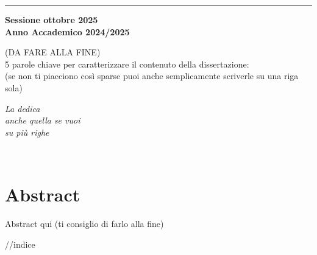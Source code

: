 \documentclass[12pt,a4paper,twoside]{book}
\begin{document}
\begin{titlepage}
\vspace{30mm}

\rule[0.5cm]{15.8cm}{0.6mm}

\begin{center}
{\large{\bf Sessione ottobre 2025 \\}}
{\large{\bf Anno Accademico 2024/2025\\}}
\end{center}

\end{titlepage}

\restoregeometry
\newpage
\begin{center}
    (DA FARE ALLA FINE)\\
    5 parole chiave per caratterizzare il contenuto della dissertazione:\\ (se non ti piacciono così sparse puoi anche semplicamente scriverle su una riga sola)
\end{center}

\newpage

\topmargin=6.5cm
\begin{flushright}
\emph{
\LARGE{La dedica}\\\vspace{2mm}
\LARGE{anche quella se vuoi}\\\vspace{3mm} 
\LARGE{su più righe} 
}
\end{flushright}
\newpage~\newpage
{}
\chapter*{Abstract}
Abstract qui (ti consiglio di farlo alla fine)

\topmargin=-1cm
\tableofcontents //indice
\thispagestyle{empty}
\listoftables
\thispagestyle{empty}
\listoffigures
\thispagestyle{empty}
\newpage~\newpage
\end{document}
